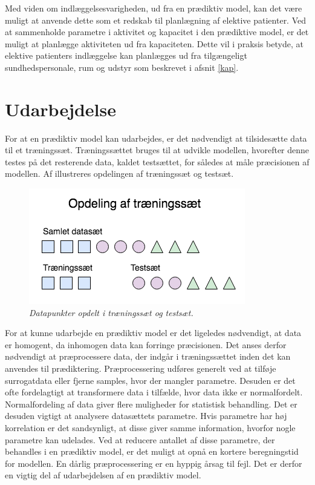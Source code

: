 Med viden om indlæggelsesvarigheden, ud fra en prædiktiv model, kan det være muligt at anvende dette som et redskab til planlægning af elektive patienter. Ved at sammenholde parametre i aktivitet og kapacitet i den prædiktive model, er det muligt at planlægge aktiviteten ud fra kapaciteten. Dette vil i praksis betyde, at elektive patienters indlæggelse kan planlægges ud fra tilgængeligt sundhedspersonale, rum og udstyr som beskrevet i afsnit \ref{kap}. 


\section{Udarbejdelse}
For at en prædiktiv model kan udarbejdes, er det nødvendigt at tilsidesætte data til et træningssæt. Træningssættet bruges til at udvikle modellen, hvorefter denne testes på det resterende data, kaldet testsættet, for således at måle præcisionen af modellen. Af  illustreres opdelingen af træningssæt og testsæt.

\begin{figure}[H]
	\centering
	\includegraphics[scale=.7]{figures/xval.png}
	\caption{\textit{Datapunkter opdelt i træningssæt og testsæt.}\cite{Kuhn2013}}
	\label{traenings}
\end{figure}

\noindent
For at kunne udarbejde en prædiktiv model er det ligeledes nødvendigt, at data er homogent, da inhomogen data kan forringe præcisionen. 
Det anses derfor nødvendigt at præprocessere data, der indgår i træningssættet inden det kan anvendes til prædiktering.\cite{Kuhn2013}
Præprocessering udføres generelt ved at tilføje surrogatdata eller fjerne samples, hvor der mangler parametre. Desuden er det ofte fordelagtigt at transformere data i tilfælde, hvor data ikke er normalfordelt. Normalfordeling af data giver flere muligheder for statistisk behandling.
Det er desuden vigtigt at analysere datasættets parametre. Hvis parametre har høj korrelation er det sandsynligt, at disse giver samme information, hvorfor nogle parametre kan udelades. Ved at reducere antallet af disse parametre, der behandles i en prædiktiv model, er det muligt at opnå en kortere beregningstid for modellen.
En dårlig præprocessering er en hyppig årsag til fejl. Det er derfor en vigtig del af udarbejdelsen af en prædiktiv model.\cite{Kuhn2013}


